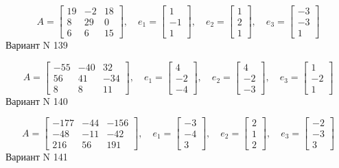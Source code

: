 \documentclass[11pt]{report}
\begin{document}
$$A = \left[\begin{matrix}19 & -2 & 18\\8 & 29 & 0\\6 & 6 & 15\end{matrix}\right],\quad e_1 = \left[\begin{matrix}1\\-1\\1\end{matrix}\right],\quad e_2 = \left[\begin{matrix}1\\2\\1\end{matrix}\right],\quad e_3 = \left[\begin{matrix}-3\\-3\\1\end{matrix}\right]$$Вариант N 139

$$A = \left[\begin{matrix}-55 & -40 & 32\\56 & 41 & -34\\8 & 8 & 11\end{matrix}\right],\quad e_1 = \left[\begin{matrix}4\\-2\\-4\end{matrix}\right],\quad e_2 = \left[\begin{matrix}4\\-2\\-3\end{matrix}\right],\quad e_3 = \left[\begin{matrix}1\\-2\\1\end{matrix}\right]$$Вариант N 140

$$A = \left[\begin{matrix}-177 & -44 & -156\\-48 & -11 & -42\\216 & 56 & 191\end{matrix}\right],\quad e_1 = \left[\begin{matrix}-3\\-4\\3\end{matrix}\right],\quad e_2 = \left[\begin{matrix}2\\1\\2\end{matrix}\right],\quad e_3 = \left[\begin{matrix}-2\\-3\\3\end{matrix}\right]$$Вариант N 141
\end{document}
